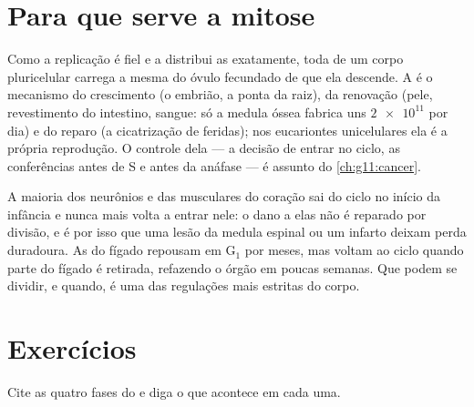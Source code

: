 \section{Para que serve a mitose}

\begin{proposition}\label{prop:g11:cell-cycle-mitosis:conformity}
Como a replicação é fiel e a  distribui as 
exatamente, toda  de um corpo pluricelular carrega a mesma
 do óvulo fecundado de que ela descende. A  é
o mecanismo do crescimento (o embrião, a ponta da raiz), da renovação
(pele, revestimento do intestino, sangue: só a medula óssea fabrica uns
$\num{2e11}$  por dia) e do reparo (a cicatrização de feridas);
nos eucariontes unicelulares ela é a própria reprodução. O controle
dela --- a decisão de entrar no ciclo, as conferências antes de S e
antes da anáfase --- é assunto do \cref{ch:g11:cancer}.
\end{proposition}
\admitted

\begin{remark}\label{rem:g11:cell-cycle-mitosis:notall}
A maioria dos neurônios e das  musculares do coração sai do
ciclo no início da infância e nunca mais volta a entrar nele: o dano a
elas não é reparado por divisão, e é por isso que uma lesão da medula
espinal ou um infarto deixam perda duradoura. As  do fígado
repousam em $\mathrm{G_1}$ por meses, mas voltam ao ciclo quando parte
do fígado é retirada, refazendo o órgão em poucas semanas. Que 
podem se dividir, e quando, é uma das regulações mais estritas do
corpo.
\end{remark}

\section{Exercícios}

\begin{exercise}[$\star$]\label{exo:g11:cell-cycle-mitosis:1}
Cite as quatro fases do  e diga o que acontece em cada uma.
\end{exercise}

